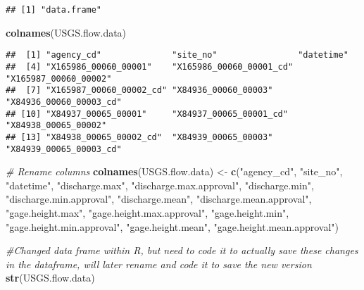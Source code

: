 \documentclass[]{article}
\newenvironment{Shaded}{\begin{snugshade}}{\end{snugshade}}
\newcommand{\CommentTok}[1]{\textcolor[rgb]{0.56,0.35,0.01}{\textit{#1}}}
\newcommand{\KeywordTok}[1]{\textcolor[rgb]{0.13,0.29,0.53}{\textbf{#1}}}
\newcommand{\NormalTok}[1]{#1}
\newcommand{\StringTok}[1]{\textcolor[rgb]{0.31,0.60,0.02}{#1}}
\begin{document}
\begin{verbatim}
## [1] "data.frame"
\end{verbatim}

\begin{Shaded}
\begin{Highlighting}[]
\KeywordTok{colnames}\NormalTok{(USGS.flow.data)}
\end{Highlighting}
\end{Shaded}

\begin{verbatim}
##  [1] "agency_cd"              "site_no"                "datetime"              
##  [4] "X165986_00060_00001"    "X165986_00060_00001_cd" "X165987_00060_00002"   
##  [7] "X165987_00060_00002_cd" "X84936_00060_00003"     "X84936_00060_00003_cd" 
## [10] "X84937_00065_00001"     "X84937_00065_00001_cd"  "X84938_00065_00002"    
## [13] "X84938_00065_00002_cd"  "X84939_00065_00003"     "X84939_00065_00003_cd"
\end{verbatim}

\begin{Shaded}
\begin{Highlighting}[]
\CommentTok{# Rename columns}
\KeywordTok{colnames}\NormalTok{(USGS.flow.data) <-}\StringTok{ }\KeywordTok{c}\NormalTok{(}\StringTok{"agency_cd"}\NormalTok{, }\StringTok{"site_no"}\NormalTok{, }\StringTok{"datetime"}\NormalTok{, }
                              \StringTok{"discharge.max"}\NormalTok{, }\StringTok{"discharge.max.approval"}\NormalTok{, }
                              \StringTok{"discharge.min"}\NormalTok{, }\StringTok{"discharge.min.approval"}\NormalTok{, }
                              \StringTok{"discharge.mean"}\NormalTok{, }\StringTok{"discharge.mean.approval"}\NormalTok{, }
                              \StringTok{"gage.height.max"}\NormalTok{, }\StringTok{"gage.height.max.approval"}\NormalTok{, }
                              \StringTok{"gage.height.min"}\NormalTok{, }\StringTok{"gage.height.min.approval"}\NormalTok{, }
                              \StringTok{"gage.height.mean"}\NormalTok{, }\StringTok{"gage.height.mean.approval"}\NormalTok{)}

\CommentTok{#Changed data frame within R, but need to code it to actually save these changes in the dataframe, will later rename and code it to save the new version}
\KeywordTok{str}\NormalTok{(USGS.flow.data)}
\end{Highlighting}
\end{Shaded}
\end{document}
